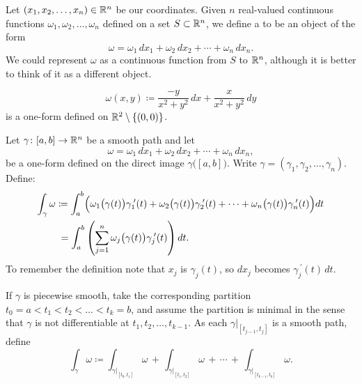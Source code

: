 \begin{defn}
Let $(x_1,x_2,\ldots,x_n) \in {\mathbb{R}}^n$ be our coordinates.
Given $n$ real-valued continuous functions
$\omega_1,\omega_2,\ldots,\omega_n$ defined on a set $S \subset {\mathbb{R}}^n$,
we define a \emph{}
to be an object of the form
\begin{equation*}
\omega = \omega_1 \,dx_1 + \omega_2 \,dx_2 + \cdots + \omega_n \,dx_n .
\end{equation*}
We could represent $\omega$ as a continuous function from $S$ to ${\mathbb{R}}^n$,
although it is better to think of it as a different object.
\end{defn}

\begin{example}
\begin{equation*}
\omega(x,y) \coloneqq \frac{-y}{x^2+y^2} \,dx + \frac{x}{x^2+y^2} \,dy
\end{equation*}
is a one-form defined on ${\mathbb{R}}^2 \setminus \{ (0,0) \}$.
\end{example}

\begin{defn}
Let $\gamma \colon [a,b] \to {\mathbb{R}}^n$ be a smooth path
and let
\begin{equation*}
\omega = \omega_1 \,dx_1 + \omega_2 \,dx_2 + \cdots + \omega_n \,dx_n ,
\end{equation*}
be a one-form defined on the direct image $\gamma\bigl([a,b]\bigr)$.
Write $\gamma = (\gamma_1,\gamma_2,\ldots,\gamma_n)$.
Define:
\begin{equation*}
\begin{split}
\int_{\gamma} \omega
& \coloneqq
\int_a^b 
\Bigl(
\omega_1\bigl(\gamma(t)\bigr) \gamma_1^{\:\prime}(t) +
\omega_2\bigl(\gamma(t)\bigr) \gamma_2^{\:\prime}(t) + \cdots +
\omega_n\bigl(\gamma(t)\bigr) \gamma_n^{\:\prime}(t) \Bigr) dt
\\
&\phantom{:}=
\int_a^b 
\left(
\sum_{j=1}^n
\omega_j\bigl(\gamma(t)\bigr) \gamma_j^{\:\prime}(t) \right) dt .
\end{split}
\end{equation*}
To remember the definition note that $x_j$ is $\gamma_j(t)$, so
$dx_j$ becomes  $\gamma_j^{\:\prime}(t) \, dt$.

If $\gamma$ is piecewise smooth, take the corresponding partition
$t_0 = a < t_1 < t_2 < \ldots < t_k = b$, and assume the partition is
minimal
in the sense that $\gamma$ is not differentiable
at $t_1,t_2,\ldots,t_{k-1}$.  As each $\gamma|_{[t_{j-1},t_j]}$ is
a smooth path, define
\begin{equation*}
\int_{\gamma} \omega
\coloneqq
\int_{\gamma|_{[t_0,t_1]}} \omega
\,
+
\,
\int_{\gamma|_{[t_1,t_2]}} \omega
\,
+ \, \cdots \, + \,
\int_{\gamma|_{[t_{k-1},t_k]}} \omega .
\end{equation*}
\end{defn}

